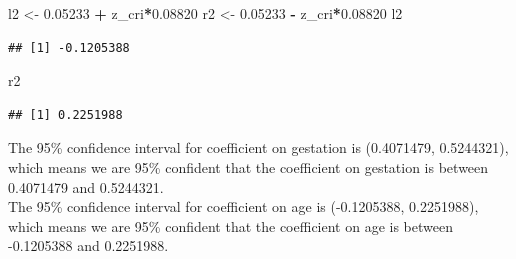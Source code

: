 \documentclass[]{article}
\newenvironment{Shaded}{\begin{snugshade}}{\end{snugshade}}
\newcommand{\FloatTok}[1]{\textcolor[rgb]{0.00,0.00,0.81}{#1}}
\newcommand{\NormalTok}[1]{#1}
\newcommand{\OperatorTok}[1]{\textcolor[rgb]{0.81,0.36,0.00}{\textbf{#1}}}
\newcommand{\StringTok}[1]{\textcolor[rgb]{0.31,0.60,0.02}{#1}}
\begin{document}
\begin{Shaded}
\begin{Highlighting}[]
\NormalTok{l2 <-}\StringTok{ }\FloatTok{0.05233} \OperatorTok{+}\StringTok{ }\NormalTok{z_cri}\OperatorTok{*}\FloatTok{0.08820}
\NormalTok{r2 <-}\StringTok{ }\FloatTok{0.05233} \OperatorTok{-}\StringTok{ }\NormalTok{z_cri}\OperatorTok{*}\FloatTok{0.08820}
\NormalTok{l2}
\end{Highlighting}
\end{Shaded}

\begin{verbatim}
## [1] -0.1205388
\end{verbatim}

\begin{Shaded}
\begin{Highlighting}[]
\NormalTok{r2}
\end{Highlighting}
\end{Shaded}

\begin{verbatim}
## [1] 0.2251988
\end{verbatim}

The 95\% confidence interval for coefficient on gestation is (0.4071479,
0.5244321), which means we are 95\% confident that the coefficient on
gestation is between 0.4071479 and 0.5244321.\\
The 95\% confidence interval for coefficient on age is (-0.1205388,
0.2251988), which means we are 95\% confident that the coefficient on
age is between -0.1205388 and 0.2251988.
\end{document}
